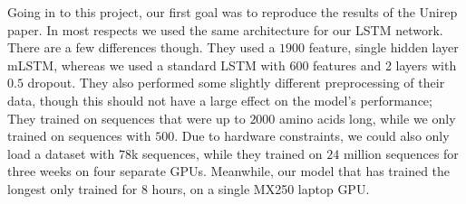 Going in to this project, our first goal was to reproduce the results of the Unirep paper\cite{unirep}. In most respects we used the same architecture for our LSTM network. There are a few differences though. They used a $1900$ feature, single hidden layer mLSTM, whereas we used a standard LSTM with $600$ features and 2 layers with $0.5$ dropout. They also performed some slightly different preprocessing of their data, though this should not have a large effect on the model's performance; They trained on sequences that were up to $2000$ amino acids long, while we only trained on sequences with $500$. Due to hardware constraints, we could also only load a dataset with $78$k sequences, while they trained on $24$ million sequences for three weeks on four separate GPUs. Meanwhile, our model that has trained the longest only trained for $8$ hours, on a single MX250 laptop GPU.